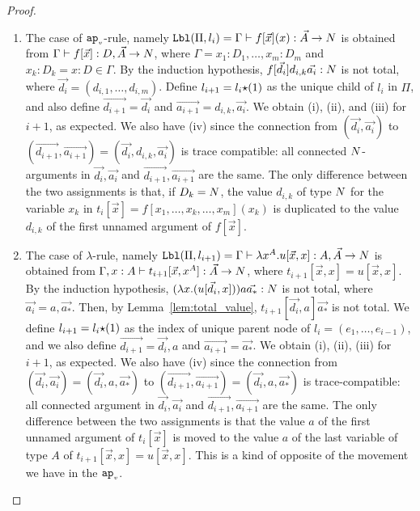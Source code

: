 \begin{proof}
\begin{enumerate}
\item
  The case of ${{\tt ap}_{\mbox{\tiny $v$}}}$-rule, namely 
  ${\tt Lbl}(\Pi,l_i) 
  = 
  \Gamma \vdash f[\vec{x}](x): \vec{A}\rightarrow{N}$ is obtained from
  $\Gamma \vdash f[\vec{x}]: D,\vec{A} \rightarrow {N}$,
  where $\Gamma=x_1:D_1,\ldots,x_m:D_m$ and $x_k:D_k = x:D\in\Gamma$. 
  By the induction hypothesis, $f[\vec{d_i}]d_{i,k}\vec{a_i}:{N}$ is not total,
  where $\vec{d_i} = (d_{i,1},\ldots,d_{i,m})$. 
  Define $l_{i+1}=l_i{\star}(1)$ as the unique child of $l_i$ in $\Pi$, and
  also define $\vec{d_{i+1}} = \vec{d_i}$ and $\vec{a_{i+1}} = d_{i,k},\vec{a_i}$. 
  We obtain (i), (ii), and (iii) for $i+1$, as expected.
  We also have (iv) since the connection from
  $(\vec{d_i},\vec{a_i})$ to
  $(\vec{d_{i+1}},\vec{a_{i+1}}) = (\vec{d_i},d_{i,k},\vec{a_i})$
  is trace compatible: all connected ${N}$-arguments in $\vec{d_i},\vec{a_i}$ and 
  $\vec{d_{i+1}},\vec{a_{i+1}}$ are the same.  
  The only difference between the two assignments
  is that, if $D_k = {N}$, the value $d_{i,k}$ of type ${N}$ for the variable $x_k$
  in $t_i[\vec{x}]=f[x_1,\ldots,x_k,\ldots,x_m](x_k)$ is duplicated to the value $d_{i,k}$ 
  of the first unnamed argument of $ f[\vec{x}]$. 

\item
  The case of $\lambda$-rule, namely
  ${\tt Lbl}(\Pi,l_{i+1}) = 
    \Gamma\vdash \lambda x^A.u[\vec{x},x] : A, \vec{A} \rightarrow {N}$ is obtained from
  $\Gamma,x:A\vdash t_{i+1}[\vec{x},x^A]:\vec{A}\rightarrow{N}$, 
  where $t_{i+1}[\vec{x},x]=u[\vec{x},x]$.
  By the induction hypothesis, $(\lambda x.(u[\vec{d_i},x]))a\vec{a_*}:{N}$ is not total,
  where $\vec{a_i} = a,\vec{a_*}$.
  Then, by Lemma~\ref{lem:total_value}, $t_{i+1}[\vec{d_i},a]\vec{a_*}$ is not total. 
  We define $l_{i+1} = l_i {\star} (1)$ as the index of unique parent node of $l_{i}=(e_1,\ldots,e_{i-1})$,
  and we also define $\vec{d_{i+1}} = \vec{d_i},a$ and $\vec{a_{i+1}} = \vec{a_*}$. 
  We obtain (i), (ii), (iii) for $i+1$, as expected.
  We also have (iv) since the connection from 
  $(\vec{d_i},\vec{a_i}) = (\vec{d_i},a,\vec{a_*})$ 
  to $(\vec{d_{i+1}},\vec{a_{i+1}}) = (\vec{d_i},a,\vec{a_*})$
  is trace-compatible: all connected argument in $\vec{d_i},\vec{a_i}$ and 
  $\vec{d_{i+1}},\vec{a_{i+1}}$ are the same. The only difference between the two assignments
  is that the value $a$ of the first unnamed argument of $t_i[\vec{x}]$ is moved to the value $a$
  of the last variable of type $A$ of $t_{i+1}[\vec{x},x]=u[\vec{x},x]$.
  This is a kind of opposite of the movement we have in the ${{\tt ap}_{\mbox{\tiny $v$}}}$.


\end{enumerate}
\end{proof}

